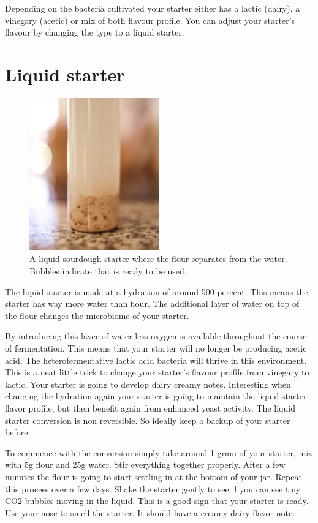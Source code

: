 Depending on the bacteria cultivated your starter either has a lactic (dairy),
a vinegary (acetic) or mix of both flavour profile. You can adjust your
starter's flavour by changing the type to a liquid starter.

\section{Liquid starter}

\begin{figure}[!htb]
  \centering
  \includegraphics[width=0.5\textwidth]{sourdough-starter-liquid.jpg}
  \caption{A liquid sourdough starter where the flour separates from the water. Bubbles indicate
  that is ready to be used.}
  \label{fig:liquid-sourdough-starter}
\end{figure}

The liquid starter is made at a hydration of around 500 percent. This means
the starter has way more water than flour. The additional layer of water on
top of the flour changes the microbiome of your starter.

By introducing this layer of water less oxygen is available throughout the
course of fermentation. This means that your starter will no longer be
producing acetic acid. The heterofermentative lactic acid bacteria will thrive
in this environment. This is a neat little trick to change your starter's
flavour profile from vinegary to lactic. Your starter is going to develop
dairy creamy notes. Interesting when changing the hydration again your starter
is going to maintain the liquid starter flavor profile, but then benefit again
from enhanced yeast activity. The liquid starter conversion is non reversible.
So ideally keep a backup of your starter before.

To commence with the
conversion simply take around 1 gram of your starter, mix with 5g flour and
25g water. Stir everything together properly. After a few minutes the flour is
going to start settling in at the bottom of your jar. Repeat this process over
a few days. Shake the starter gently to see if you can see tiny CO2 bubbles
moving in the liquid. This is a good sign that your starter is ready. Use your
nose to smell the starter. It should have a creamy dairy flavor note.

